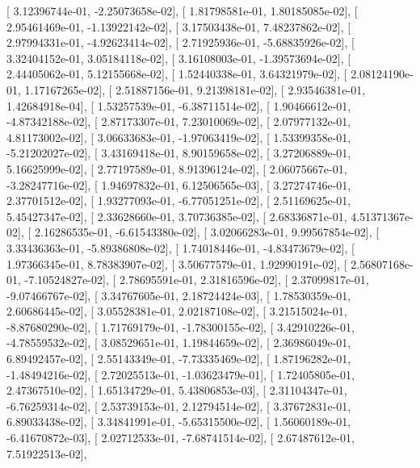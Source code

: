 \documentclass{article}
\begin{document}
       [  3.12396744e-01,  -2.25073658e-02],
       [  1.81798581e-01,   1.80185085e-02],
       [  2.95461469e-01,  -1.13922142e-02],
       [  3.17503438e-01,   7.48237862e-02],
       [  2.97994331e-01,  -4.92623414e-02],
       [  2.71925936e-01,  -5.68835926e-02],
       [  3.32404152e-01,   3.05184118e-02],
       [  3.16108003e-01,  -1.39573694e-02],
       [  2.44405062e-01,   5.12155668e-02],
       [  1.52440338e-01,   3.64321979e-02],
       [  2.08124190e-01,   1.17167265e-02],
       [  2.51887156e-01,   9.21398181e-02],
       [  2.93546381e-01,   1.42684918e-04],
       [  1.53257539e-01,  -6.38711514e-02],
       [  1.90466612e-01,  -4.87342188e-02],
       [  2.87173307e-01,   7.23010069e-02],
       [  2.07977132e-01,   4.81173002e-02],
       [  3.06633683e-01,  -1.97063419e-02],
       [  1.53399358e-01,  -5.21202027e-02],
       [  3.43169418e-01,   8.90159658e-02],
       [  3.27206889e-01,   5.16625999e-02],
       [  2.77197589e-01,   8.91396124e-02],
       [  2.06075667e-01,  -3.28247716e-02],
       [  1.94697832e-01,   6.12506565e-03],
       [  3.27274746e-01,   2.37701512e-02],
       [  1.93277093e-01,  -6.77051251e-02],
       [  2.51169625e-01,   5.45427347e-02],
       [  2.33628660e-01,   3.70736385e-02],
       [  2.68336871e-01,   4.51371367e-02],
       [  2.16286535e-01,  -6.61543380e-02],
       [  3.02066283e-01,   9.99567854e-02],
       [  3.33436363e-01,  -5.89386808e-02],
       [  1.74018446e-01,  -4.83473679e-02],
       [  1.97366345e-01,   8.78383907e-02],
       [  3.50677579e-01,   1.92990191e-02],
       [  2.56807168e-01,  -7.10524827e-02],
       [  2.78695591e-01,   2.31816596e-02],
       [  2.37099817e-01,  -9.07466767e-02],
       [  3.34767605e-01,   2.18724424e-03],
       [  1.78530359e-01,   2.60686445e-02],
       [  3.05528381e-01,   2.02187108e-02],
       [  3.21515024e-01,  -8.87680290e-02],
       [  1.71769179e-01,  -1.78300155e-02],
       [  3.42910226e-01,  -4.78559532e-02],
       [  3.08529651e-01,   1.19844659e-02],
       [  2.36986049e-01,   6.89492457e-02],
       [  2.55143349e-01,  -7.73335469e-02],
       [  1.87196282e-01,  -1.48494216e-02],
       [  2.72025513e-01,  -1.03623479e-01],
       [  1.72405805e-01,   2.47367510e-02],
       [  1.65134729e-01,   5.43806853e-03],
       [  2.31104347e-01,  -6.76259314e-02],
       [  2.53739153e-01,   2.12794514e-02],
       [  3.37672831e-01,   6.89033438e-02],
       [  3.34841991e-01,  -5.65315500e-02],
       [  1.56060189e-01,  -6.41670872e-03],
       [  2.02712533e-01,  -7.68741514e-02],
       [  2.67487612e-01,   7.51922513e-02],
\end{document}
